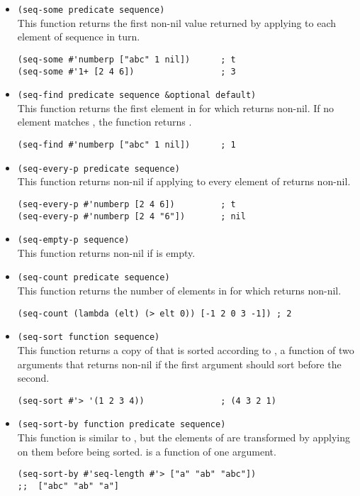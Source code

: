 \begin{itemize}
\item \lstinline|(seq-some predicate sequence)|\\
  This function returns the first non-nil value returned by applying  to each element of sequence in turn.
\begin{lstlisting}
(seq-some #'numberp ["abc" 1 nil])      ; t
(seq-some #'1+ [2 4 6])                 ; 3
\end{lstlisting}
  
\item \lstinline|(seq-find predicate sequence &optional default)|\\
  This function returns the first element in  for which  returns non-nil.
  If no element matches , the function returns .
\begin{lstlisting}
(seq-find #'numberp ["abc" 1 nil])      ; 1
\end{lstlisting}
\item \lstinline|(seq-every-p predicate sequence)|\\
  This function returns non-nil if applying  to every element of  returns non-nil.
\begin{lstlisting}
(seq-every-p #'numberp [2 4 6])         ; t
(seq-every-p #'numberp [2 4 "6"])       ; nil
\end{lstlisting}
  
\item \lstinline|(seq-empty-p sequence)|\\
  This function returns non-nil if  is empty.

\item \lstinline|(seq-count predicate sequence)|\\
  This function returns the number of elements in  for which  returns non-nil.
\begin{lstlisting}
(seq-count (lambda (elt) (> elt 0)) [-1 2 0 3 -1]) ; 2
\end{lstlisting}
\item \lstinline|(seq-sort function sequence)|\\
  This function returns a copy of  that is sorted according to , a function of two arguments that returns non-nil if the first argument should sort before the second.
\begin{lstlisting}
(seq-sort #'> '(1 2 3 4))               ; (4 3 2 1)
\end{lstlisting}
\item \lstinline|(seq-sort-by function predicate sequence)|\\
  This function is similar to , but the elements of  are transformed by applying  on them before being sorted.
   is a function of one argument.
\begin{lstlisting}
(seq-sort-by #'seq-length #'> ["a" "ab" "abc"])
;;  ["abc" "ab" "a"]
\end{lstlisting}


\end{itemize}
